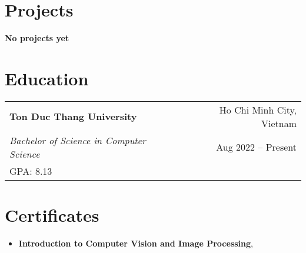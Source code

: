 \documentclass[letterpaper,11pt]{article}
\begin{document}
\section{Projects}
\textbf{No projects yet}

\section{Education}
\begin{tabularx}{\textwidth}{Xr}
  \textbf{Ton Duc Thang University}                & Ho Chi Minh City, Vietnam \\
  \textit{Bachelor of Science in Computer Science} & Aug 2022 -- Present       \\
  GPA: 8.13                                        &                           \\
\end{tabularx}

\section{Certificates}
\begin{itemize}
  \item \textbf{Introduction to Computer Vision and Image Processing},
\end{itemize}

\end{document}
